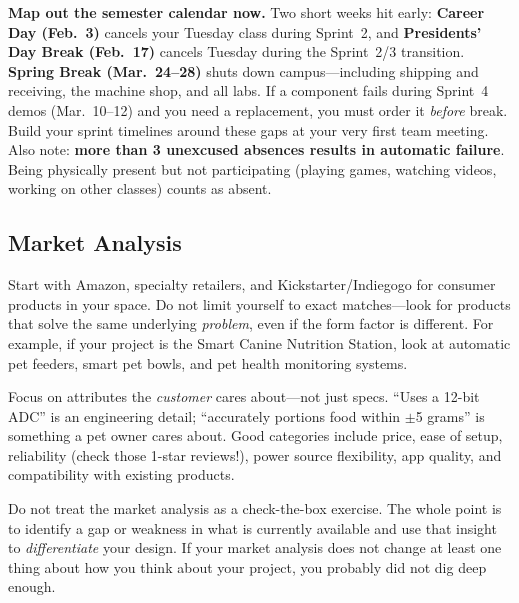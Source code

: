 \documentclass[11pt,letterpaper]{article}
\begin{document}
\begin{protip}
\textbf{Map out the semester calendar now.} Two short weeks hit early: \textbf{Career Day (Feb.~3)} cancels your Tuesday class during Sprint~2, and \textbf{Presidents' Day Break (Feb.~17)} cancels Tuesday during the Sprint~2/3 transition. \textbf{Spring Break (Mar.~24--28)} shuts down campus---including shipping and receiving, the machine shop, and all labs. If a component fails during Sprint~4 demos (Mar.~10--12) and you need a replacement, you must order it \textit{before} break. Build your sprint timelines around these gaps at your very first team meeting. Also note: \textbf{more than 3 unexcused absences results in automatic failure}. Being physically present but not participating (playing games, watching videos, working on other classes) counts as absent.
\end{protip}

\subsection{Market Analysis}

\begin{faqbox}
Start with Amazon, specialty retailers, and Kickstarter/Indiegogo for consumer products in your space. Do not limit yourself to exact matches---look for products that solve the same underlying \textit{problem}, even if the form factor is different. For example, if your project is the Smart Canine Nutrition Station, look at automatic pet feeders, smart pet bowls, and pet health monitoring systems.
\end{faqbox}

\begin{faqbox}
Focus on attributes the \textit{customer} cares about---not just specs. ``Uses a 12-bit ADC'' is an engineering detail; ``accurately portions food within $\pm$5 grams'' is something a pet owner cares about. Good categories include price, ease of setup, reliability (check those 1-star reviews!), power source flexibility, app quality, and compatibility with existing products.
\end{faqbox}

\begin{warnbox}
Do not treat the market analysis as a check-the-box exercise. The whole point is to identify a gap or weakness in what is currently available and use that insight to \textit{differentiate} your design. If your market analysis does not change at least one thing about how you think about your project, you probably did not dig deep enough.
\end{warnbox}
\end{document}
